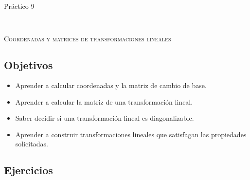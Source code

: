 \documentclass[12pt]{amsart}
\begin{document}



\centerline{\Large{Pr\' actico 9}}

\

\centerline{\textsc{Coordenadas y matrices de transformaciones lineales}}

\subsection*{Objetivos}

\begin{itemize}
 \item Aprender a calcular coordenadas y la matriz de cambio de base.
 \item Aprender a calcular la matriz de una transformaci\'on lineal.
 \item Saber decidir si una transformaci\'on lineal es diagonalizable.
 \item Aprender a construir transformaciones lineales que satisfagan las propiedades solicitadas.
\end{itemize}


\bigbreak 


\subsection*{Ejercicios}
\end{document}
